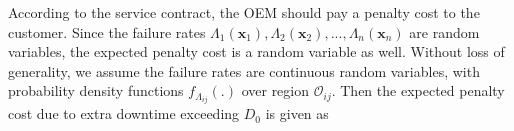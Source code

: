 \documentclass[preprint,12pt]{elsarticle}
\begin{document}
According to the service contract, the OEM should pay a penalty cost to the customer. Since the failure rates $\Lambda_{1}(\boldsymbol{x}_{1}),\Lambda_{2}(\boldsymbol{x}_{2}),...,\Lambda_{n}(\boldsymbol{x}_{n})$ are random variables, the expected penalty cost is a random variable as well. Without loss of generality, we assume the failure rates are continuous random variables, with probability density functions $f_{\Lambda_{ij}}(.)$ over region $\mathcal{O}_{ij}$. Then the expected penalty cost due to extra downtime exceeding $D_{0}$ is given as
\end{document}
